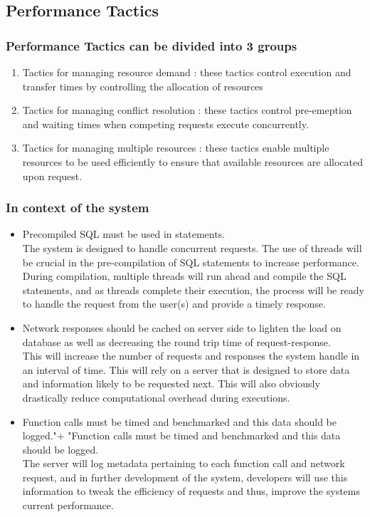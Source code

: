 \documentclass[a4paper,10pt]{article}
\begin{document}
\subsection{Performance Tactics}
	\subsubsection{Performance Tactics can be divided into 3 groups}
		\begin{enumerate}
			\item Tactics for managing resource demand : these tactics control execution and transfer times by controlling the allocation of resources
			\item Tactics for managing conflict resolution : these tactics control pre-emeption and waiting times when competing requests execute concurrently. 
			\item Tactics for managing multiple resources : these tactics enable multiple resources to be used efficiently to ensure that available resources are allocated upon request. 
		\end{enumerate}

	\subsubsection{In context of the system}
		\begin{itemize}
			\item Precompiled SQL must be used in statements.\\
				The system is designed to handle concurrent requests. The use of threads will be crucial in the pre-compilation of SQL statements to increase performance. During compilation, multiple threads will run ahead and compile the SQL statements, and as threads complete their execution, the process will be ready to handle the request from the user(s) and provide a timely response. 

			\item Network responses should be cached on server side to lighten the load on database as well as decreasing the round trip time of request-response.\\
				This will increase the number of requests and responses the system handle in an interval of time. This will rely on a server that is designed to store data and information likely to be requested next. This will also obviously drastically reduce computational overhead during executions. 
			\item Function calls must be timed and benchmarked and this data should be logged."+ "Function calls must be timed and benchmarked and this data should be logged.\\
				The server will log metadata pertaining to each function call and network request, and in further development of the system, developers will use this information to tweak the efficiency of requests and thus, improve the systems current performance. 
		\end{itemize}
\end{document}
